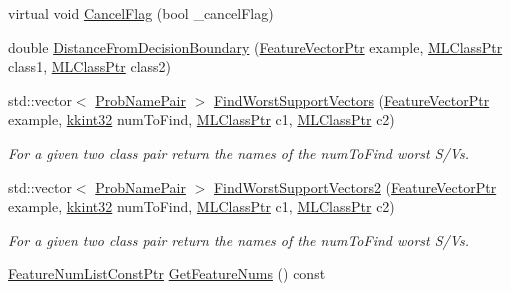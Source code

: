 \begin{DoxyCompactItemize}
\item 
virtual void \hyperlink{class_k_k_m_l_l_1_1_s_v_m_model_a7dcac874892ae9e161d17ff097bb555e}{Cancel\+Flag} (bool \+\_\+cancel\+Flag)
\item 
double \hyperlink{class_k_k_m_l_l_1_1_s_v_m_model_abe91fa28c9c6fda597a79e60bcb702da}{Distance\+From\+Decision\+Boundary} (\hyperlink{namespace_k_k_m_l_l_a0c5df3d48f45926fbc4fee04f5e3bc04}{Feature\+Vector\+Ptr} example, \hyperlink{namespace_k_k_m_l_l_ac272393853d59e72e8456f14cd6d8c23}{M\+L\+Class\+Ptr} class1, \hyperlink{namespace_k_k_m_l_l_ac272393853d59e72e8456f14cd6d8c23}{M\+L\+Class\+Ptr} class2)
\item 
std\+::vector$<$ \hyperlink{class_k_k_m_l_l_1_1_prob_name_pair}{Prob\+Name\+Pair} $>$ \hyperlink{class_k_k_m_l_l_1_1_s_v_m_model_a5edb1c8e3a68a0cd9363ad5c7e70ef43}{Find\+Worst\+Support\+Vectors} (\hyperlink{namespace_k_k_m_l_l_a0c5df3d48f45926fbc4fee04f5e3bc04}{Feature\+Vector\+Ptr} example, \hyperlink{namespace_k_k_b_a8fa4952cc84fda1de4bec1fbdd8d5b1b}{kkint32} num\+To\+Find, \hyperlink{namespace_k_k_m_l_l_ac272393853d59e72e8456f14cd6d8c23}{M\+L\+Class\+Ptr} c1, \hyperlink{namespace_k_k_m_l_l_ac272393853d59e72e8456f14cd6d8c23}{M\+L\+Class\+Ptr} c2)
\begin{DoxyCompactList}\small\item\em For a given two class pair return the names of the \textquotesingle{}num\+To\+Find\textquotesingle{} worst S/V\textquotesingle{}s. \end{DoxyCompactList}\item 
std\+::vector$<$ \hyperlink{class_k_k_m_l_l_1_1_prob_name_pair}{Prob\+Name\+Pair} $>$ \hyperlink{class_k_k_m_l_l_1_1_s_v_m_model_a79401afd040562c6d7e1439a866a1e54}{Find\+Worst\+Support\+Vectors2} (\hyperlink{namespace_k_k_m_l_l_a0c5df3d48f45926fbc4fee04f5e3bc04}{Feature\+Vector\+Ptr} example, \hyperlink{namespace_k_k_b_a8fa4952cc84fda1de4bec1fbdd8d5b1b}{kkint32} num\+To\+Find, \hyperlink{namespace_k_k_m_l_l_ac272393853d59e72e8456f14cd6d8c23}{M\+L\+Class\+Ptr} c1, \hyperlink{namespace_k_k_m_l_l_ac272393853d59e72e8456f14cd6d8c23}{M\+L\+Class\+Ptr} c2)
\begin{DoxyCompactList}\small\item\em For a given two class pair return the names of the \textquotesingle{}num\+To\+Find\textquotesingle{} worst S/V\textquotesingle{}s. \end{DoxyCompactList}\item 
\hyperlink{namespace_k_k_m_l_l_a81284b0a14973267260023f9a72da94a}{Feature\+Num\+List\+Const\+Ptr} \hyperlink{class_k_k_m_l_l_1_1_s_v_m_model_a372e1697fb96ee4ccdbb4d9e3aa3058c}{Get\+Feature\+Nums} () const 

\end{DoxyCompactItemize}
